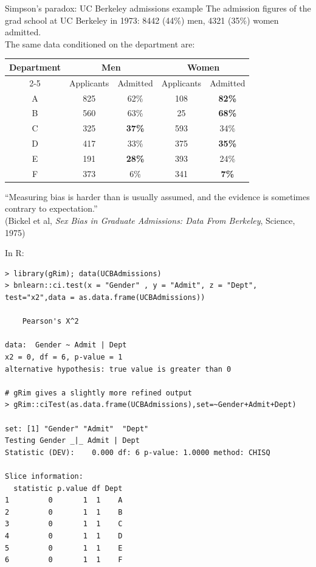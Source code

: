 \documentclass[dvipsnames,aspectratio=169]{beamer} %
\begin{document}
\begin{frame}[label=SP]{Simpson's paradox: UC Berkeley admissions example}
		The admission figures of the grad school at UC Berkeley in 1973: 8442 (44\%) men, 4321 (35\%) women admitted.\\[.3cm] The same data conditioned on the department are:\\[.3cm]
\hspace{.7cm}\begin{tabular}{|c|c|c|c|c|}
\hline
\multirow{2}{*}{Department} & \multicolumn{2}{c|}{Men}   & \multicolumn{2}{c|}{Women} \\ \cline{2-5} 
                            & Applicants & Admitted       & Applicants & Admitted       \\ \hline
A                           & 825        & 62\%          & 108        & \textbf{82\%} \\ \hline
B                           & 560        & 63\%          & 25         & \textbf{68\%} \\ \hline
C                           & 325        & \textbf{37\%} & 593        & 34\%          \\ \hline
D                           & 417        & 33\%          & 375        & \textbf{35\%} \\ \hline
E                           & 191        & \textbf{28\%} & 393        & 24\%          \\ \hline
F                           & 373        & 6\%           & 341        & \textbf{7\%}  \\ \hline
\end{tabular}
\medskip

``Measuring bias is harder than is usually assumed, and the evidence is sometimes contrary to expectation.''\\[.3cm] \tiny(Bickel et al,  \textit{Sex Bias in Graduate Admissions: Data From Berkeley}, Science, 1975) 
\end{frame}

\begin{frame}[fragile]{}
	In R:
	\begin{lstlisting}
> library(gRim); data(UCBAdmissions)
> bnlearn::ci.test(x = "Gender" , y = "Admit", z = "Dept", test="x2",data = as.data.frame(UCBAdmissions))

	Pearson's X^2

data:  Gender ~ Admit | Dept
x2 = 0, df = 6, p-value = 1
alternative hypothesis: true value is greater than 0

# gRim gives a slightly more refined output
> gRim::ciTest(as.data.frame(UCBAdmissions),set=~Gender+Admit+Dept)

set: [1] "Gender" "Admit"  "Dept"  
Testing Gender _|_ Admit | Dept 
Statistic (DEV):    0.000 df: 6 p-value: 1.0000 method: CHISQ

Slice information:
  statistic p.value df Dept
1         0       1  1    A
2         0       1  1    B
3         0       1  1    C
4         0       1  1    D
5         0       1  1    E
6         0       1  1    F
 \end{lstlisting}
\end{frame}
\end{document}
